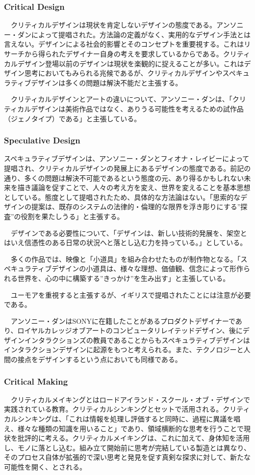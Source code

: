 \subsubsection{Critical Design}
　クリティカルデザインは現状を肯定しないデザインの態度である。アンソニー・ダンによって提唱された。方法論の定義がなく、実用的なデザイン手法とは言えない。デザインによる社会的影響とそのコンセプトを重要視する。これはリサーチから得られたデザイナー自身の考えを要求しているからである。クリティカルデザイン登場以前のデザインは現状を楽観的に捉えることが多い。これはデザイン思考においてもみられる兆候であるが、クリティカルデザインやスペキュラティブデザインは多くの問題は解決不能だと主張する。

　クリティカルデザインとアートの違いについて、アンソニー・ダンは、「クリティカルデザインは美術作品ではなく、ありうる可能性を考えるための試作品（ジェノタイプ）である」と主張している。


\subsubsection{Speculative Design}
スペキュラティブデザインは、アンソニー・ダンとフィオナ・レイビーによって提唱され、クリティカルデザインの発展上にあるデザインの態度である。前記の通り、多くの問題は解決不可能であるという態度の元、あり得るかもしれない未来を描き議論を促すことで、人々の考え方を変え、世界を変えることを基本思想としている。態度として提唱されたため、具体的な方法論はない。「思索的なデザインの提案は、既存のシステムの法律的・倫理的な限界を浮き彫りにする”探査”の役割を果たしうる」と主張する。

　デザインである必要性について、「デザインは、新しい技術的発展を、架空とはいえ信憑性のある日常の状況へと落とし込む力を持っている。」としている。

　多くの作品では、映像と「小道具」を組み合わせたものが制作物となる。「スペキュラティブデザインの小道具は、様々な理想、価値観、信念によって形作られる世界を、心の中に構築する”きっかけ”を生み出す」と主張している。

　ユーモアを重視すると主張するが、イギリスで提唱されたことには注意が必要である。

　アンソニー・ダンはSONYに在籍したことがあるプロダクトデザイナーであり、ロイヤルカレッジオブアートのコンピュータリレイテッドデザイン、後にデザインインタラクションズの教員であることからもスペキュラティブデザインはインタラクションデザインに起源をもつと考えられる。また、テクノロジーと人間の接点をデザインするという点においても同様である。

\subsubsection{Critical Making}
　クリティカルメイキングとはロードアイランド・スクール・オブ・デザインで実践されている教育。クリティカルシンキングとセットで活用される。クリティカルシンキングは、「これは情報を処理し評価すると同時に、過程に異議を唱え、様々な種類の知識を用いること」であり、領域横断的な思考を行うことで現状を批評的に考える。クリティカルメイキングは、これに加えて、身体知を活用し、モノに落とし込む。組み立て開始前に思考が完結している製造とは異なり、そのプロセス自体が拡張的で深い思考と発見を促す真剣な探求に対して、新たな可能性を開く、とされる。

